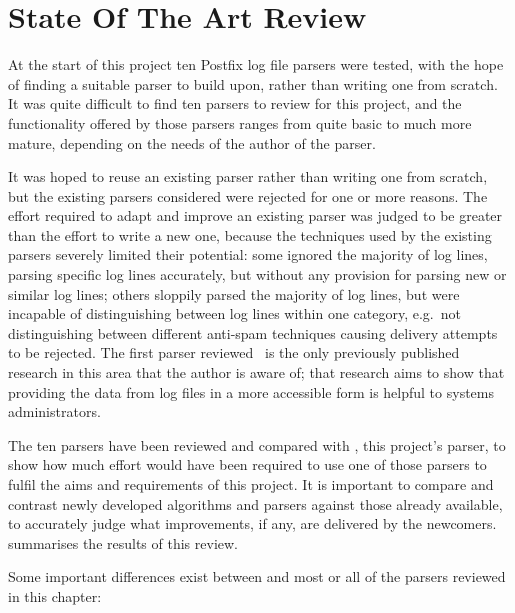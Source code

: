\chapter{State Of The Art Review}

\label{state of the art review}

At the start of this project ten Postfix log file parsers were tested, with
the hope of finding a suitable parser to build upon, rather than writing
one from scratch.  It was quite difficult to find ten parsers to review for
this project, and the functionality offered by those parsers ranges from
quite basic to much more mature, depending on the needs of the author of
the parser.

It was hoped to reuse an existing parser rather than writing one from
scratch, but the existing parsers considered were rejected for one or more
reasons.  The effort required to adapt and improve an existing parser was
judged to be greater than the effort to write a new one, because the
techniques used by the existing parsers severely limited their potential:
some ignored the majority of log lines, parsing specific log lines
accurately, but without any provision for parsing new or similar log lines;
others sloppily parsed the majority of log lines, but were incapable of
distinguishing between log lines within one category, e.g.\ not
distinguishing between different anti-spam techniques causing delivery
attempts to be rejected.  The first parser
reviewed~\cite{log-mail-analyser} is the only previously published research
in this area that the author is aware of; that research aims to show that
providing the data from log files in a more accessible form is helpful to
systems administrators.

The ten parsers have been reviewed and compared with \parsername{}, this
project's parser, to show how much effort would have been required to use
one of those parsers to fulfil the aims and requirements of this project.
It is important to compare and contrast newly developed algorithms and
parsers against those already available, to accurately judge what
improvements, if any, are delivered by the newcomers.   summarises the results of this review.

Some important differences exist between \parsername{} and most or all of
the parsers reviewed in this chapter:

